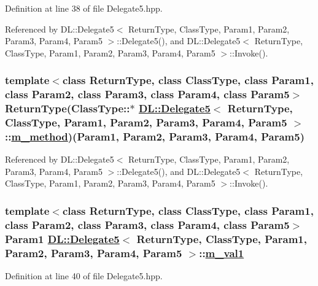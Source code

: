 Definition at line 38 of file Delegate5.hpp.

Referenced by DL::Delegate5$<$ Return\-Type, Class\-Type, Param1, Param2, Param3, Param4, Param5 $>$::Delegate5(), and DL::Delegate5$<$ Return\-Type, Class\-Type, Param1, Param2, Param3, Param4, Param5 $>$::Invoke().\hypertarget{classDL_1_1Delegate5_r1}{
\subsubsection[m\_\-method]{\setlength{\rightskip}{0pt plus 5cm}template$<$class Return\-Type, class Class\-Type, class Param1, class Param2, class Param3, class Param4, class Param5$>$ Return\-Type(Class\-Type::$\ast$ \hyperlink{classDL_1_1Delegate5}{DL::Delegate5}$<$ Return\-Type, Class\-Type, Param1, Param2, Param3, Param4, Param5 $>$::\hyperlink{classDL_1_1Delegate5_r1}{m\_\-method})(Param1, Param2, Param3, Param4, Param5)}}
\label{classDL_1_1Delegate5_r1}




Referenced by DL::Delegate5$<$ Return\-Type, Class\-Type, Param1, Param2, Param3, Param4, Param5 $>$::Delegate5(), and DL::Delegate5$<$ Return\-Type, Class\-Type, Param1, Param2, Param3, Param4, Param5 $>$::Invoke().\hypertarget{classDL_1_1Delegate5_r2}{
\subsubsection[m\_\-val1]{\setlength{\rightskip}{0pt plus 5cm}template$<$class Return\-Type, class Class\-Type, class Param1, class Param2, class Param3, class Param4, class Param5$>$ Param1 \hyperlink{classDL_1_1Delegate5}{DL::Delegate5}$<$ Return\-Type, Class\-Type, Param1, Param2, Param3, Param4, Param5 $>$::\hyperlink{classDL_1_1Delegate5_r2}{m\_\-val1}}}
\label{classDL_1_1Delegate5_r2}




Definition at line 40 of file Delegate5.hpp.

